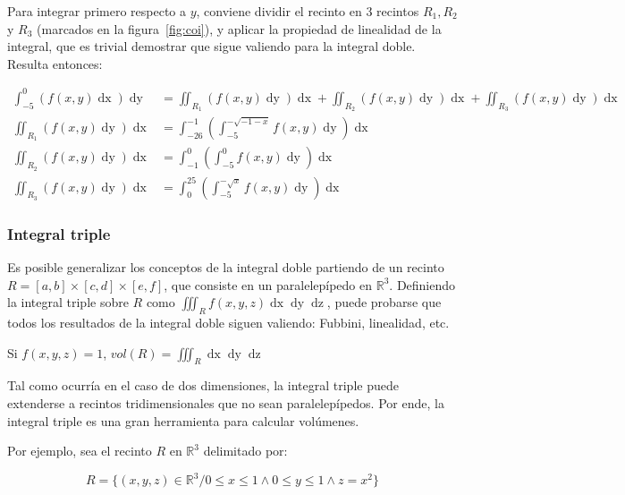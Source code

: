 \documentclass{article}
\renewcommand{\Bbb}{\mathbb}
\begin{document}
\begin{enumerate}[(A)]
Para integrar primero respecto a $y$, conviene dividir el recinto en 3 recintos $R_1, R_2$ y $R_3$ (marcados en la figura~\ref{fig:coi}), y aplicar la propiedad de linealidad de la integral, que es trivial demostrar que sigue valiendo para la integral doble. Resulta entonces:

\begin{subequations}
\begin{align}
\int_{-5}^0 \left( f(x,y) \mathop{dx} \right) \mathop{dy} &= \iint_{R_1} (f(x,y) \mathop{dy}) \mathop{dx} + \iint_{R_2} (f(x,y) \mathop{dy}) \mathop{dx} + \iint_{R_3} (f(x,y) \mathop{dy}) \mathop{dx} \\
\iint_{R_1} (f(x,y) \mathop{dy}) \mathop{dx} &= \int_{-26}^{-1} \left( \int_{-5}^{-\sqrt{-1-x}} f(x,y) \mathop{dy}  \right) \mathop{dx} \\
\iint_{R_2} (f(x,y) \mathop{dy}) \mathop{dx} &= \int_{-1}^{0} \left( \int_{-5}^0 f(x,y) \mathop{dy} \right) \mathop{dx} \\
\iint_{R_3} (f(x,y) \mathop{dy}) \mathop{dx} &= \int_{0}^{25} \left( \int_{-5}^{-\sqrt{x}} f(x,y) \mathop{dy} \right) \mathop{dx}
\end{align}
\end{subequations}

\end{enumerate}

\subsubsection{Integral triple}

Es posible generalizar los conceptos de la integral doble partiendo de un recinto $R = [a,b] \times [c,d] \times [e,f]$, que consiste en un paralelepípedo en $\Bbb R^3$. Definiendo la integral triple sobre $R$ como $\iiint_R f(x,y,z) \mathop{dx} \mathop{dy} \mathop{dz}$, puede probarse que todos los resultados de la integral doble siguen valiendo: Fubbini, linealidad, etc.

Si $f(x,y,z) = 1$, $vol(R) = \iiint_R \mathop{dx} \mathop{dy} \mathop{dz}$

Tal como ocurría en el caso de dos dimensiones, la integral triple puede extenderse a recintos tridimensionales que no sean paralelepípedos. Por ende, la integral triple es una gran herramienta para calcular volúmenes.

Por ejemplo, sea el recinto $R$ en $\Bbb R^3$ delimitado por:

\begin{equation}
R = \{ (x,y,z) \in \Bbb R^3 / 0 \leq x \leq 1 \wedge 0 \leq y \leq 1 \wedge z = x^2 \}
\end{equation}
\end{document}
